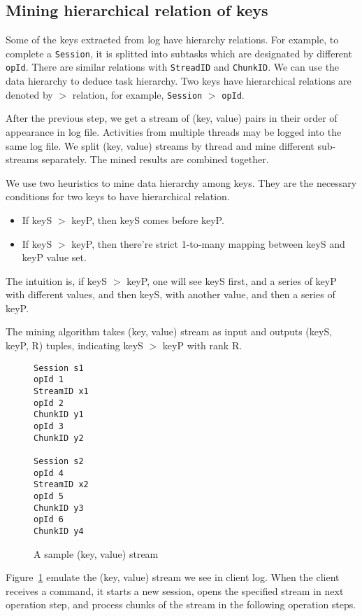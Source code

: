 \subsection{Mining hierarchical relation of keys}

Some of the keys extracted from log have hierarchy
relations. For example, to complete a \texttt{Session}, it
is splitted into subtasks which are designated by different
\texttt{opId}. There are similar relations with
\texttt{StreadID} and \texttt{ChunkID}. We can use the data
hierarchy to deduce task hierarchy. Two keys have
hierarchical relations are denoted by $>$ relation, for
example, \texttt{Session} $>$ \texttt{opId}.

After the previous step, we get a stream of (key, value)
pairs in their order of appearance in log file. Activities
from multiple threads may be logged into the same log file.
We split (key, value) streams by thread and mine different
sub-streams separately. The mined results are combined
together.

We use two heuristics to mine data hierarchy among keys.
They are the necessary conditions for two keys to have
hierarchical relation.
\begin{itemize}
\item If keyS $>$ keyP, then keyS comes before keyP.
\item If keyS $>$ keyP, then there're strict 1-to-many
mapping between keyS and keyP value set.
\end{itemize}
The intuition is, if keyS $>$ keyP, one will see keyS first,
and a series of keyP with different values, and then keyS,
with another value, and then a series of keyP.

The mining algorithm takes (key, value) stream as input and
outputs (keyS, keyP, R) tuples, indicating keyS $>$ keyP
with rank R.

\begin{figure}
\centering
\begin{verbatim}
Session s1
opId 1
StreamID x1
opId 2
ChunkID y1
opId 3
ChunkID y2

Session s2
opId 4
StreamID x2
opId 5
ChunkID y3
opId 6
ChunkID y4
\end{verbatim}
\caption{A sample (key, value) stream}
\label{fig:kvstream}
\end{figure}

Figure~\ref{fig:kvstream} emulate the (key, value) stream we
see in \cosmos client log. When the client receives a
command, it starts a new session, opens the specified stream
in next operation step, and process chunks of the stream in
the following operation steps.

